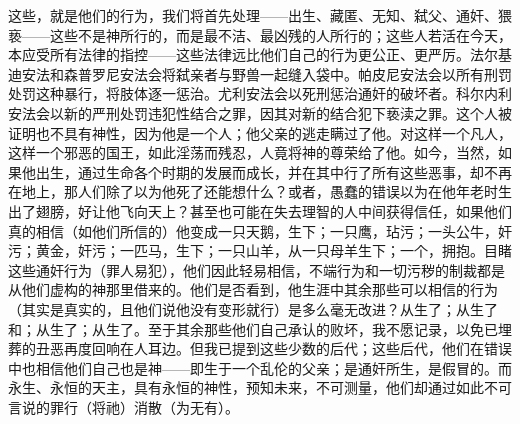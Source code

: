 这些，就是他们的行为，我们将首先处理——出生、藏匿、无知、弑父、通奸、猥亵——这些不是神所行的，而是最不洁、最凶残的人所行的；这些人若活在今天，本应受所有法律的指控——这些法律远比他们自己的行为更公正、更严厉。法尔基迪安法和森普罗尼安法会将弑亲者与野兽一起缝入袋中。帕皮尼安法会以所有刑罚处罚这种暴行，将肢体逐一惩治。尤利安法会以死刑惩治通奸的破坏者。科尔内利安法会以新的严刑处罚违犯性结合之罪，因其对新的结合犯下亵渎之罪。这个人被证明也不具有神性，因为他是一个人；他父亲的逃走瞒过了他。对这样一个凡人，这样一个邪恶的国王，如此淫荡而残忍，人竟将神的尊荣给了他。如今，当然，如果他出生，通过生命各个时期的发展而成长，并在其中行了所有这些恶事，却不再在地上，那人们除了以为他死了还能想什么？或者，愚蠢的错误以为在他年老时生出了翅膀，好让他飞向天上？甚至也可能在失去理智的人中间获得信任，如果他们真的相信（如他们所信的）他变成一只天鹅，生下；一只鹰，玷污；一头公牛，奸污；黄金，奸污；一匹马，生下；一只山羊，从一只母羊生下；一个，拥抱。目睹这些通奸行为（罪人易犯），他们因此轻易相信，不端行为和一切污秽的制裁都是从他们虚构的神那里借来的。他们是否看到，他生涯中其余那些可以相信的行为（其实是真实的，且他们说他没有变形就行）是多么毫无改进？从生了；从生了和；从生了；从生了。至于其余那些他们自己承认的败坏，我不愿记录，以免已埋葬的丑恶再度回响在人耳边。但我已提到这些少数的后代；这些后代，他们在错误中也相信他们自己也是神——即生于一个乱伦的父亲；是通奸所生，是假冒的。而永生、永恒的天主，具有永恒的神性，预知未来，不可测量，他们却通过如此不可言说的罪行（将祂）消散（为无有）。\par

